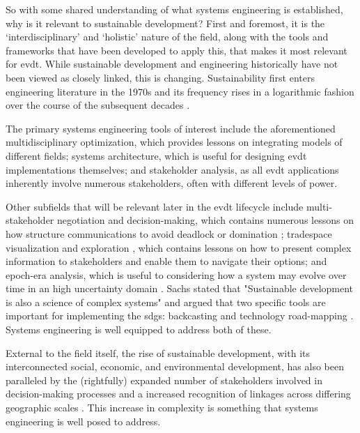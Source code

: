 So with some shared understanding of what systems engineering is established, why is it relevant to sustainable development? First and foremost, it is the `interdisciplinary' and `holistic' nature of the field, along with the tools and frameworks that have been developed to apply this, that makes it most relevant for \ac{evdt}. While sustainable development and engineering historically have not been viewed as closely linked, this is changing. Sustainability first enters engineering literature in the 1970s and its frequency rises in a logarithmic fashion over the course of the subsequent decades \cite{deweckInvestigatingRelationshipsSemantic2012}.

The primary systems engineering tools of interest include the aforementioned multidisciplinary optimization, which provides lessons on integrating models of different fields; systems architecture, which is useful for designing \ac{evdt} implementations themselves; and stakeholder analysis, as all \ac{evdt} applications inherently involve numerous stakeholders, often with different levels of power. 

Other subfields that will be relevant later in the \ac{evdt} lifecycle include multi-stakeholder negotiation and decision-making, which contains numerous lessons on how structure communications to avoid deadlock or domination \cite{fitzgeraldEffectsEnhancedMultiparty2015,fitzgeraldRecommendationsFramingMultistakeholder2016,weckMULTISTAKEHOLDERSIMULATIONGAMING2012}; tradespace visualization and exploration \cite{fitzgeraldEffectsEnhancedMultiparty2015,fitzgeraldRecommendationsFramingMultistakeholder2016,groganInteractiveModelsSystem2015,rossMultiAttributeTradespaceExploration2004,selvavaleroRulebasedSystemArchitecting2012}, which contains lessons on how to present complex information to stakeholders and enable them to navigate their options; and epoch-era analysis, which is useful to considering how a system may evolve over time in an high uncertainty domain \cite{rossUsingNaturalValueCentric2008,vascikMethodExploringProgram2015}. Sachs stated that "Sustainable development is also a science of complex systems" and argued that two specific tools are important for implementing the \acp{sdg}: backcasting and technology road-mapping \cite{sachsAgeSustainableDevelopment2015}. Systems engineering is well equipped to address both of these.


External to the field itself, the rise of sustainable development, with its interconnected social, economic, and environmental development, has also been paralleled by the (rightfully) expanded number of stakeholders involved in decision-making processes and a increased recognition of linkages across differing geographic scales \cite{brommelstroetPlanningSupportSystems2010}. This increase in complexity is something that systems engineering is well posed to address.


